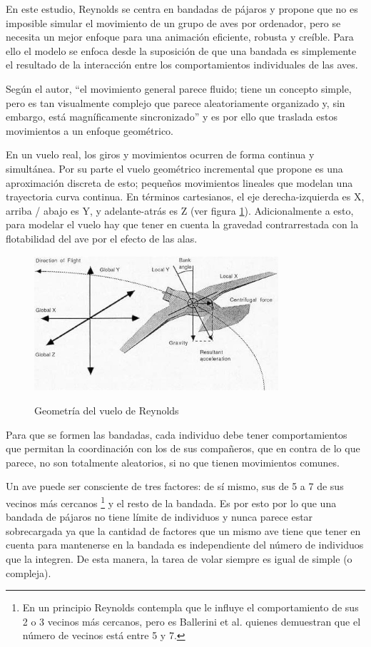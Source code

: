 En este estudio, Reynolds se centra en bandadas de pájaros y propone que no es imposible simular el movimiento de un grupo de aves por ordenador, pero se necesita un mejor enfoque para una animación eficiente, robusta y creíble. Para ello el modelo se enfoca desde la suposición de que una bandada es simplemente el resultado de la interacción entre los comportamientos individuales de las aves.

Según el autor, ``el movimiento general parece fluido; tiene un concepto simple, pero es tan visualmente complejo que parece aleatoriamente organizado y, sin embargo, está magníficamente sincronizado'' y es por ello que traslada estos movimientos a un enfoque geométrico.

En un vuelo real, los giros y movimientos ocurren de forma continua y simultánea. Por su parte el vuelo geométrico incremental que propone es una aproximación discreta de esto; pequeños movimientos lineales que modelan una trayectoria curva continua. En términos cartesianos, el eje derecha-izquierda es X, arriba / abajo es Y, y adelante-atrás es Z (ver figura \ref{fig:geometricalFlight}). Adicionalmente a esto, para modelar el vuelo hay que tener en cuenta la gravedad contrarrestada con la flotabilidad del ave por el efecto de las alas.

\begin{figure}[h!]
    \centering
    {\includegraphics[height=5cm]{fig/cap02/geometricalFlight.JPG}}
    \caption{Geometría del vuelo de Reynolds}
    \label{fig:geometricalFlight}
\end{figure}

Para que se formen las bandadas, cada individuo debe tener comportamientos que permitan la coordinación con los de sus compañeros, que en contra de lo que parece, no son totalmente aleatorios, si no que tienen movimientos comunes.

Un ave puede ser consciente de tres factores: de sí mismo, sus de 5 a 7 de sus vecinos más cercanos \cite{ballerini2008interaction}\footnote{En un principio Reynolds contempla que le influye el comportamiento de sus 2 o 3 vecinos más cercanos, pero es Ballerini et al. quienes demuestran que el número de vecinos está entre 5 y 7.} y el resto de la bandada. Es por esto por lo que una bandada de pájaros no tiene límite de individuos y nunca parece estar sobrecargada ya que la cantidad de factores que un mismo ave tiene que tener en cuenta para mantenerse en la bandada es independiente del número de individuos que la integren. De esta manera, la tarea de volar siempre es igual de simple (o compleja).

